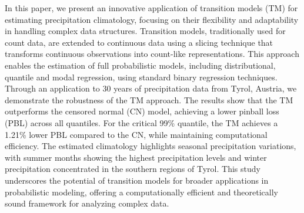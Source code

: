 \documentclass[english,a4paper,11pt]{article}
\begin{document}
In this paper, we present an innovative application of transition models (TM) for estimating 
precipitation climatology, focusing on their flexibility and adaptability in handling complex 
data structures. Transition models, traditionally used for count data, are extended to 
continuous data using a slicing technique that transforms continuous observations into
count-like representations. This approach enables the estimation of full probabilistic models, 
including distributional, quantile and modal regression, using standard binary regression techniques.
Through an application to 30 years of precipitation data from Tyrol, Austria, we demonstrate
the robustness of the TM approach. The results show that the TM outperforms the censored normal 
(CN) model, achieving a lower pinball loss (PBL) across all quantiles.
For the critical 99\% quantile, the TM achieves a 1.21\% lower PBL compared to the CN,
while maintaining computational efficiency. The estimated climatology highlights seasonal 
precipitation variations, with summer months showing the highest precipitation levels
and winter precipitation concentrated in the southern regions of Tyrol.
This study underscores the potential of transition models for broader applications in 
probabilistic modeling, offering a computationally efficient and theoretically sound framework 
for analyzing complex data.

%
%



\end{document}

